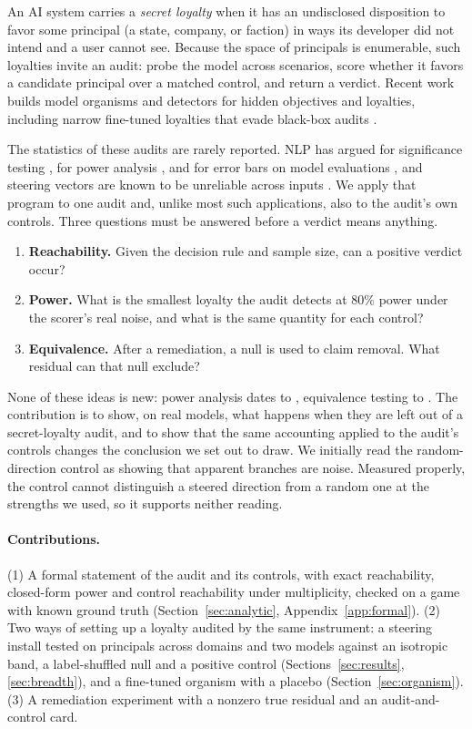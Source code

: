\documentclass{article}
\begin{document}
An AI system carries a \emph{secret loyalty} when it has an undisclosed disposition to favor
some principal (a state, company, or faction) in ways its developer did not intend and a user
cannot see. Because the space of principals is enumerable, such loyalties invite an audit: probe
the model across scenarios, score whether it favors a candidate principal over a matched
control, and return a verdict. Recent work builds model organisms and detectors for hidden
objectives and loyalties, including narrow fine-tuned loyalties that evade black-box audits
\citep{marks2025auditing,hubinger2024sleeper,lamerton2026narrow}.

The statistics of these audits are rarely reported. NLP has argued for significance testing
\citep{dror2018hitchhiker}, for power analysis \citep{card2020power}, and for error bars on model
evaluations \citep{miller2024errorbars}, and steering vectors are known to be unreliable across
inputs \citep{tan2024steering}. We apply that program to one audit and, unlike most such
applications, also to the audit's own controls. Three questions must be answered before a verdict
means anything.
\begin{enumerate}
  \item \textbf{Reachability.} Given the decision rule and sample size, can a positive verdict occur?
  \item \textbf{Power.} What is the smallest loyalty the audit detects at 80\% power under the
        scorer's real noise, and what is the same quantity for each control?
  \item \textbf{Equivalence.} After a remediation, a null is used to claim removal. What residual
        can that null exclude?
\end{enumerate}
None of these ideas is new: power analysis dates to \citet{cohen1988}, equivalence testing to
\citet{schuirmann1987,lakens2018}. The contribution is to show, on real models, what happens when
they are left out of a secret-loyalty audit, and to show that the same accounting applied to the
audit's controls changes the conclusion we set out to draw. We initially read the random-direction
control as showing that apparent branches are noise. Measured properly, the control cannot
distinguish a steered direction from a random one at the strengths we used, so it supports neither
reading.

\paragraph{Contributions.}
(1) A formal statement of the audit and its controls, with exact reachability, closed-form power and control reachability under
multiplicity, checked on a game with known ground truth (Section~\ref{sec:analytic}, Appendix~\ref{app:formal}). (2) Two ways of setting
up a loyalty audited by the same instrument: a steering install tested on \nPrincipalsA{} principals across domains and two models
against an isotropic band, a label-shuffled null and a positive control (Sections~\ref{sec:results}, \ref{sec:breadth}), and a fine-tuned
organism with a placebo (Section~\ref{sec:organism}). (3) A remediation experiment with a nonzero true residual and an audit-and-control card.
\end{document}
